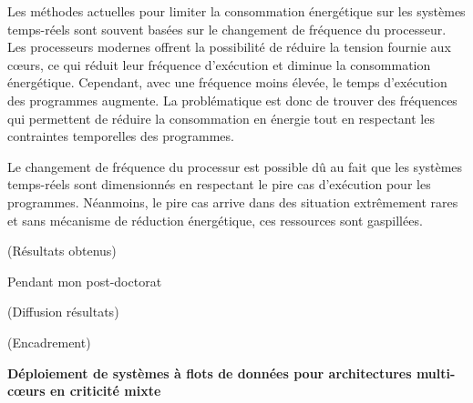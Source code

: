 \documentclass{article}
\begin{document}
Les méthodes actuelles pour limiter la consommation énergétique sur les systèmes temps-réels sont 
souvent basées sur le changement de fréquence du processeur. Les processeurs modernes offrent la 
possibilité de réduire la tension fournie aux c\oe{}urs, ce qui réduit leur fréquence d'exécution et diminue la 
consommation énergétique. Cependant, avec une fréquence moins élevée, le temps d'exécution  des 
programmes augmente. La problématique est donc de trouver des fréquences qui permettent de réduire la 
consommation en énergie tout en respectant les contraintes temporelles des programmes.


Le changement de fréquence du processur est possible dû au fait que les systèmes temps-réels sont 
dimensionnés en respectant le pire cas d'exécution pour les programmes. Néanmoins, le pire cas arrive 
dans des situation extrêmement rares et sans mécanisme de réduction énergétique, ces ressources sont 
gaspillées.
\vspace{.5cm}


(Résultats obtenus)

Pendant mon post-doctorat 


(Diffusion résultats)


(Encadrement)

\textbf{Déploiement de systèmes à flots de données pour architectures multi-c\oe{}urs en criticité mixte}
\end{document}
